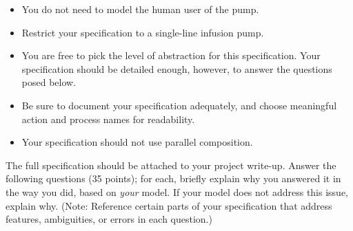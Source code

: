 \documentclass{article}
\begin{document}
\begin{itemize}
\item You do not need to model the human user of the pump.

\item Restrict your specification to a single-line infusion pump.

\item You are free to pick the level of abstraction for this specification. Your specification
should be detailed enough, however, to answer the questions posed below.

\item Be sure to document your specification adequately, and choose meaningful action and process names for readability.

\item Your specification should not use parallel composition.

\end{itemize}

\noindent The full specification should be attached to your project
write-up. Answer the following questions (35 points); for each,
briefly explain why you answered it in the way you did, based on
\emph{your} model. If your model does not address this issue,
explain why. (Note: Reference certain parts of your specification that address features, ambiguities, or errors in each question.)
\end{document}
